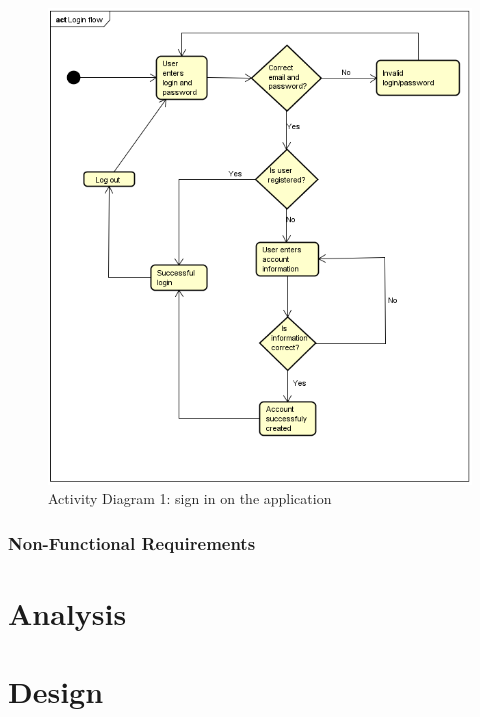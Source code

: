 \documentclass[paper=a4, fontsize=12pt,DIV=14]{scrartcl}    %
\begin{document}
		                \begin{figure}[!htbp]
		                    \center
		                    \includegraphics[scale=1]{img/act_login.png}
		                    \caption{Activity Diagram 1: sign in on the application}
		                \end{figure}



        		\subsubsection{Non-Functional Requirements}


    \newpage
        \section{Analysis}


    \newpage
        \section{Design}
\end{document}
